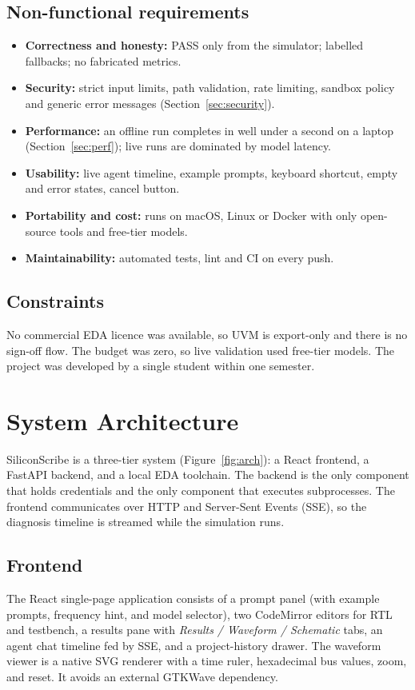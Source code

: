 \documentclass[11pt,a4paper]{article}
\begin{document}
\subsection{Non-functional requirements}
\begin{itemize}
\item \textbf{Correctness and honesty:} PASS only from the simulator; labelled fallbacks; no fabricated metrics.
\item \textbf{Security:} strict input limits, path validation, rate limiting, sandbox policy and generic error messages (Section~\ref{sec:security}).
\item \textbf{Performance:} an offline run completes in well under a second on a laptop (Section~\ref{sec:perf}); live runs are dominated by model latency.
\item \textbf{Usability:} live agent timeline, example prompts, keyboard shortcut, empty and error states, cancel button.
\item \textbf{Portability and cost:} runs on macOS, Linux or Docker with only open-source tools and free-tier models.
\item \textbf{Maintainability:} automated tests, lint and CI on every push.
\end{itemize}

\subsection{Constraints}
No commercial EDA licence was available, so UVM is export-only and there is no sign-off flow. The budget was zero, so live validation used free-tier models. The project was developed by a single student within one semester.

\section{System Architecture}
\label{sec:arch}

SiliconScribe is a three-tier system (Figure~\ref{fig:arch}): a React frontend, a
FastAPI backend, and a local EDA toolchain. The backend is the only component that
holds credentials and the only component that executes subprocesses. The frontend
communicates over HTTP and Server-Sent Events (SSE), so the diagnosis timeline is
streamed while the simulation runs.


\subsection{Frontend}
The React single-page application consists of a prompt panel (with example prompts,
frequency hint, and model selector), two CodeMirror editors for RTL and testbench,
a results pane with \emph{Results / Waveform / Schematic} tabs, an agent chat
timeline fed by SSE, and a project-history drawer. The waveform viewer is a native
SVG renderer with a time ruler, hexadecimal bus values, zoom, and reset. It avoids
an external GTKWave dependency.
\end{document}
